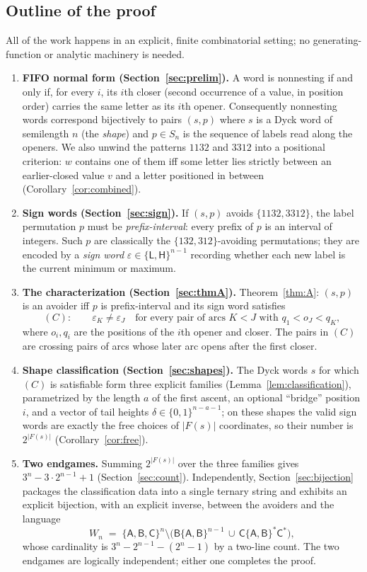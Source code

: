 \documentclass[11pt]{article}
\theoremstyle{definition}
\theoremstyle{remark}
\newcommand{\sL}{\mathsf{L}}
\newcommand{\sH}{\mathsf{H}}
\newcommand{\sA}{\mathsf{A}}
\newcommand{\sB}{\mathsf{B}}
\newcommand{\sC}{\mathsf{C}}
\newcommand{\Wn}{W_n}
\begin{document}
\subsection*{Outline of the proof}

All of the work happens in an explicit, finite combinatorial setting; no
generating-function or analytic machinery is needed.

\begin{enumerate}
\item \textbf{FIFO normal form (Section~\ref{sec:prelim}).} A word is
nonnesting if and only if, for every $i$, its $i$th closer (second occurrence
of a value, in position order) carries the same letter as its $i$th opener.
Consequently nonnesting words correspond bijectively to pairs $(s,p)$ where
$s$ is a Dyck word of semilength $n$ (the \emph{shape}) and $p\in S_n$ is the
sequence of labels read along the openers. We also unwind the patterns
$1132$ and $3312$ into a positional criterion: $w$ contains one of them iff
some letter lies strictly between an earlier-closed value $v$ and a letter
positioned in between (Corollary~\ref{cor:combined}).
\item \textbf{Sign words (Section~\ref{sec:sign}).} If $(s,p)$ avoids
$\{1132,3312\}$, the label permutation $p$ must be \emph{prefix-interval}:
every prefix of $p$ is an interval of integers. Such $p$ are classically the
$\{132,312\}$-avoiding permutations; they are encoded by a \emph{sign word}
$\varepsilon\in\{\sL,\sH\}^{n-1}$ recording whether each new label is the
current minimum or maximum.
\item \textbf{The characterization (Section~\ref{sec:thmA}).}
Theorem~\ref{thm:A}: $(s,p)$ is an avoider iff $p$ is prefix-interval and its
sign word satisfies
\[
 (C)\colon\qquad \varepsilon_K\neq\varepsilon_J\quad
 \text{for every pair of arcs } K<J \text{ with } q_1<o_J<q_K,
\]
where $o_i,q_i$ are the positions of the $i$th opener and closer. The
pairs in $(C)$ are crossing pairs of arcs whose later arc opens after the
first closer.
\item \textbf{Shape classification (Section~\ref{sec:shapes}).} The Dyck
words $s$ for which $(C)$ is satisfiable form three explicit families
(Lemma~\ref{lem:classification}), parametrized by the length $a$ of the first
ascent, an optional ``bridge'' position $i$, and a vector of tail heights
$\delta\in\{0,1\}^{n-a-1}$; on these shapes the valid sign words are exactly
the free choices of $|F(s)|$ coordinates, so their number is $2^{|F(s)|}$
(Corollary~\ref{cor:free}).
\item \textbf{Two endgames.} Summing $2^{|F(s)|}$ over the three families
gives $3^n-3\cdot2^{n-1}+1$ (Section~\ref{sec:count}). Independently,
Section~\ref{sec:bijection} packages the classification data into a single
ternary string and exhibits an explicit bijection, with an explicit inverse,
between the avoiders and the language
\[
 \Wn \;=\; \{\sA,\sB,\sC\}^n\setminus
 \bigl(\sB\{\sA,\sB\}^{n-1}\,\cup\,
 \sC\{\sA,\sB\}^*\sC^*\bigr),
\]
whose cardinality is $3^n-2^{n-1}-(2^n-1)$ by a two-line count. The two
endgames are logically independent; either one completes the proof.
\end{enumerate}
\end{document}
